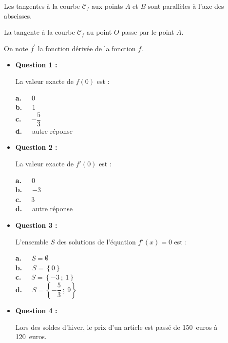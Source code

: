 \par
Les tangentes à la courbe $\mathscr{C}_{f}$ aux points $A$ et $B$ sont parallèles à l'axe des abscisses.
\par
La tangente à la courbe $\mathscr{C}_{f}$ au point $O$ passe par le point $A$.
\par
\medskip
\par
On note $f^{\prime}$  la fonction dérivée de la fonction $f$.
\par
\begin{itemize}
     \item \textbf{Question 1 :}
     \par
     La valeur exacte de $f(0)$ est :
     \par
     \textbf{a.~~} $0$ \\
     \textbf{b.~~} $1$ \\
     \textbf{c.~~} $-\dfrac{5}{3}$ \\
     \textbf{d.~~} autre réponse \\
     \par
     \item \textbf{Question 2 :}
     \par
     La valeur exacte de $f'(0)$ est :
     \par
     \textbf{a.~~} $0$ \\
     \textbf{b.~~} $-3$ \\
     \textbf{c.~~} $3$ \\
     \textbf{d.~~} autre réponse \\
     \par
     \item \textbf{Question 3 :}
     \par
     L'ensemble $S$ des solutions de l'équation $f'(x)=0$ est :
     \par
     \textbf{a.~~} $S=\emptyset$ \\
     \textbf{b.~~} $S=\left\{0\right\}$  \\
     \textbf{c.~~} $S=\left\{-3~;~1\right\}$ \\
     \textbf{d.~~} $S=\left\{-\dfrac{5}{3}~;~9\right\}$ \\
     \par
     \item \textbf{Question 4 :}
     \par
     Lors des soldes d'hiver, le prix d'un article est passé de 150~euros à 120~euros.
     \par

\end{itemize}
